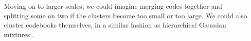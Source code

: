 \documentclass{article}
\begin{document}
Moving on to larger scales, we could imagine merging codes together and
splitting some on two if the clusters become too small or too large.  We could
also cluster codebooks themselves, in a similar fashion as hierarchical
Gaussian mixtures \cite{Vasconcelos2001}.


\small



\end{document}
